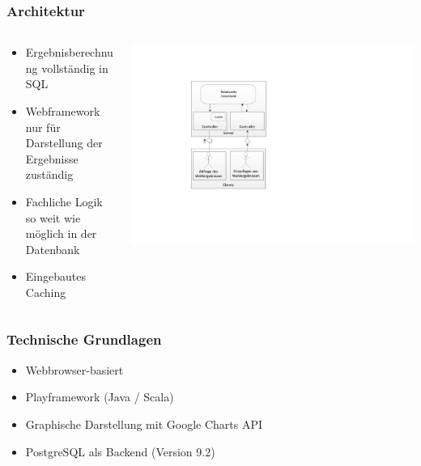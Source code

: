 \documentclass{beamer}
\begin{document}
\begin{frame}
\frametitle{Architektur}
\begin{columns}
\begin{column}{7cm}
\begin{itemize}
\item Ergebnisberechnung vollständig in SQL
\item Webframework nur für Darstellung der Ergebnisse zuständig
\item Fachliche Logik so weit wie möglich in der Datenbank
\item Eingebautes Caching
\end{itemize}
\end{column}
\begin{column}{6cm}
\includegraphics[scale=0.7]{Architecture.pdf}
\end{column}
\end{columns}
\end{frame}

\begin{frame}
\frametitle{Technische Grundlagen}
\begin{itemize}
\item Webbrowser-basiert
\item Playframework (Java / Scala)
\item Graphische Darstellung mit Google Charts API
\item PostgreSQL als Backend (Version 9.2)
\end{itemize}
\end{frame}
\end{document}
